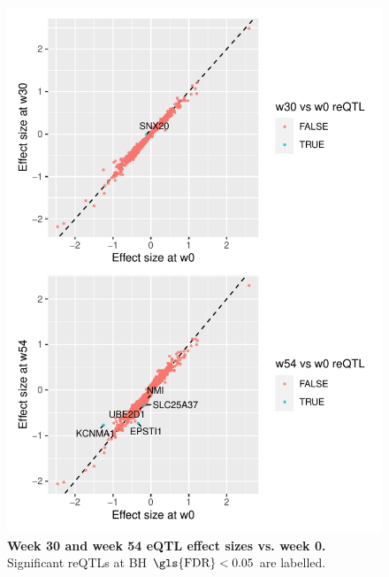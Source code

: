 \begin{figure}
    \centering
    \includegraphics[width=1.0\textwidth,page=1]{mainmatter/figures/chapter_04/plot_dge_eqtl.pm_w30_vs_w0_and_w54_vs_w0}
    \caption{
        \textbf{Week 30 and week 54 \gls{eQTL} effect sizes vs. week 0.}
        Significant \glspl{reQTL} at \gls{BH} $\text{\gls{FDR}} < 0.05$ are labelled.
    }
    \label{fig:multipants_reQTL_pm_w30_vs_w0_and_w54_vs_w0}
\end{figure}


